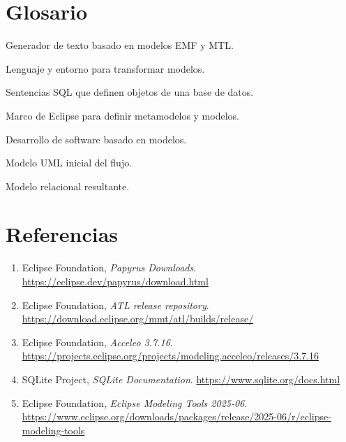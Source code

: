\documentclass[12pt,a4paper,oneside]{report}
\begin{document}
\chapter*{Glosario}
\begin{description}[leftmargin=3cm,style=nextline]
  \item[Acceleo] Generador de texto basado en modelos EMF y MTL.
  \item[ATL] Lenguaje y entorno para transformar modelos.
  \item[DDL] Sentencias SQL que definen objetos de una base de datos.
  \item[EMF/Ecore] Marco de Eclipse para definir metamodelos y modelos.
  \item[MDE] Desarrollo de software basado en modelos.
  \item[Modelo fuente] Modelo UML inicial del flujo.
  \item[Modelo destino] Modelo relacional resultante.
\end{description}

\chapter*{Referencias}
\begin{enumerate}
  \item Eclipse Foundation, \emph{Papyrus Downloads}. \url{https://eclipse.dev/papyrus/download.html}
  \item Eclipse Foundation, \emph{ATL release repository}. \url{https://download.eclipse.org/mmt/atl/builds/release/}
  \item Eclipse Foundation, \emph{Acceleo 3.7.16}. \url{https://projects.eclipse.org/projects/modeling.acceleo/releases/3.7.16}
  \item SQLite Project, \emph{SQLite Documentation}. \url{https://www.sqlite.org/docs.html}
  \item Eclipse Foundation, \emph{Eclipse Modeling Tools 2025-06}. \url{https://www.eclipse.org/downloads/packages/release/2025-06/r/eclipse-modeling-tools}
\end{enumerate}
\end{document}
